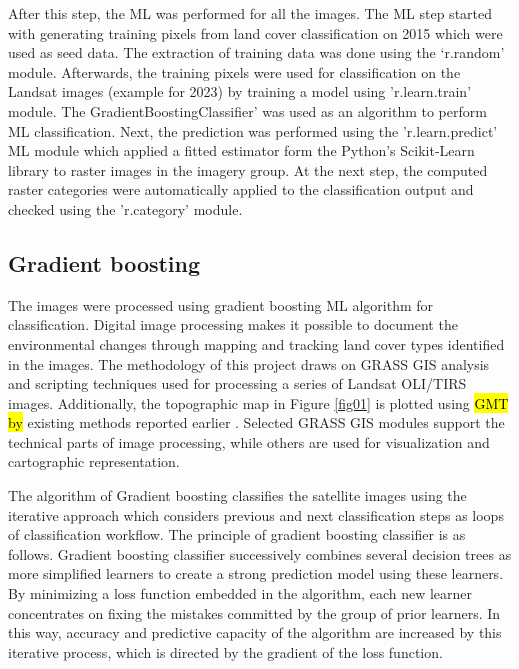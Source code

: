 \documentclass[jimaging,article,submit,pdftex,moreauthors]{Definitions/mdpi}
\begin{document}
After this step, the ML was performed for all the images. The ML step started with generating training pixels from land cover classification on 2015 which were used as seed data. The extraction of training data was done using the ‘r.random’ module{. }Afterwards, {the} training pixels were used for classification on the Landsat images (example for 2023) by training a model using 'r.learn.train' module. {The} GradientBoostingClassifier’ was used as an algorithm to perform ML classification. {Next, the} prediction was performed using the 'r.learn.predict' ML module{ }which applied a fitted estimator form the Python's Scikit-Learn library \cite{pedregosa2018} to raster images in {the} imagery group.{ At the next step, }the computed raster categories were automatically applied to the classification output and checked using the 'r.category' module{.}

\subsection{Gradient boosting}

{The} images were{ }processed using {gradient boosting ML} algorithm for classification. Digital image processing makes it possible to document the environmental changes through mapping and tracking land cover types identified in the images. The methodology of this project draws on GRASS GIS analysis and scripting techniques used for processing a series of Landsat OLI/TIRS images. Additionally, the topographic map in Figure \ref{fig01} is plotted using \hl{GMT by} existing methods reported earlier \cite{WRIGHT1998737,Lemenkova202217,9921513,Lemenkova202203,10537274}. Selected GRASS GIS modules support the technical parts of image processing, while others are used for visualization and cartographic representation.

The algorithm of Gradient boosting classifies the satellite images using the iterative approach which considers previous and next classification steps as loops of classification workflow. {The principle of gradient boosting classifier is as follows. Gradient boosting classifier successively combines several decision trees as more simplified learners to create a strong prediction model using these learners.  By minimizing a loss function embedded in the algorithm, each new learner concentrates on fixing the mistakes committed by the group of prior learners. In this way, accuracy and predictive capacity of the algorithm are increased by this iterative process, which is directed by the gradient of the loss function.}
\end{document}
